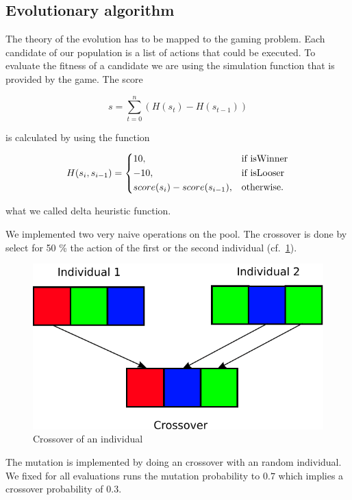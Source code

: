 \subsection{Evolutionary algorithm} 

The theory of the evolution has to be mapped to the gaming problem. Each candidate of our population is
a list of actions that could be executed. To evaluate the fitness of a candidate we are using the
simulation function that is provided by the game. 
The score

\begin{equation}
s = \sum_{t=0}^n (H(s_t) - H(s_{t-1}))
\end{equation}

is calculated by using the function

\begin{equation}
    H(s_i, s_{i-1}) = 
\begin{dcases}
    10, & \text{if isWinner}  \\
    -10, & \text{if isLooser}  \\
    score(s_i) - score(s_{i-1}), & \text{otherwise.}
\end{dcases}
\end{equation}

what we called delta heuristic function.

We implemented two very naive operations on the pool. The crossover is done by
select for 50 \% the action of the first or the second individual (cf.~\cref{fig:crossover}).

\begin{figure}[H]
\centering
\includegraphics[scale=0.6]{images/crossover.pdf}
\caption{Crossover of an individual}
\label{fig:crossover}
\end{figure}

The mutation is implemented by doing an crossover with an random individual.
We fixed for all evaluations runs the mutation probability to $0.7$ which implies a crossover 
probability of $0.3$.

